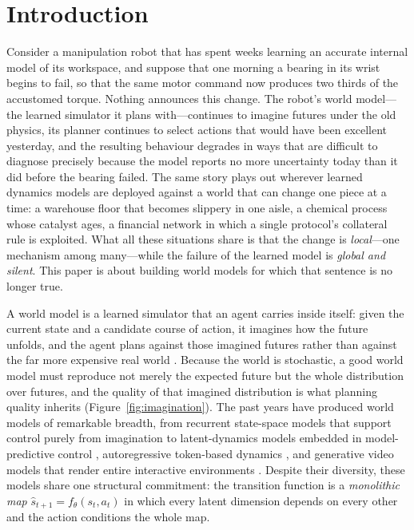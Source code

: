 \documentclass[preprint,12pt]{elsarticle}
\theoremstyle{definition}
\theoremstyle{remark}
\begin{document}
\section{Introduction}\label{sec:intro}

Consider a manipulation robot that has spent weeks learning an accurate
internal model of its workspace, and suppose that one morning a bearing
in its wrist begins to fail, so that the same motor command now produces
two thirds of the accustomed torque. Nothing announces this change. The
robot's world model---the learned simulator it plans with---continues to
imagine futures under the old physics, its planner continues to select
actions that would have been excellent yesterday, and the resulting
behaviour degrades in ways that are difficult to diagnose precisely
because the model reports no more uncertainty today than it did before
the bearing failed. The same story plays out wherever learned dynamics
models are deployed against a world that can change one piece at a time:
a warehouse floor that becomes slippery in one aisle, a chemical process
whose catalyst ages, a financial network in which a single protocol's
collateral rule is exploited. What all these situations share is that
the change is \emph{local}---one mechanism among many---while the failure
of the learned model is \emph{global and silent}. This paper is about
building world models for which that sentence is no longer true.

A world model is a learned simulator that an agent carries inside
itself: given the current state and a candidate course of action, it
imagines how the future unfolds, and the agent plans against those
imagined futures rather than against the far more expensive real world
\citep{sutton1991dyna,ha2018world,hafner2025mastering}. Because the
world is stochastic, a good world model must reproduce not merely the
expected future but the whole distribution over futures, and the quality
of that imagined distribution is what planning quality inherits
(Figure~\ref{fig:imagination}). The past years have produced world
models of remarkable breadth, from recurrent state-space models that
support control purely from imagination
\citep{hafner2019planet,hafner2025mastering} to latent-dynamics models
embedded in model-predictive control \citep{hansen2024tdmpc2},
autoregressive token-based dynamics \citep{micheli2023transformers}, and
generative video models that render entire interactive environments
\citep{bruce2024genie}. Despite their diversity, these models share one
structural commitment: the transition function is a \emph{monolithic
map} $\hat{s}_{t+1}=f_\theta(s_t,a_t)$ in which every latent dimension
depends on every other and the action conditions the whole map.
\end{document}
